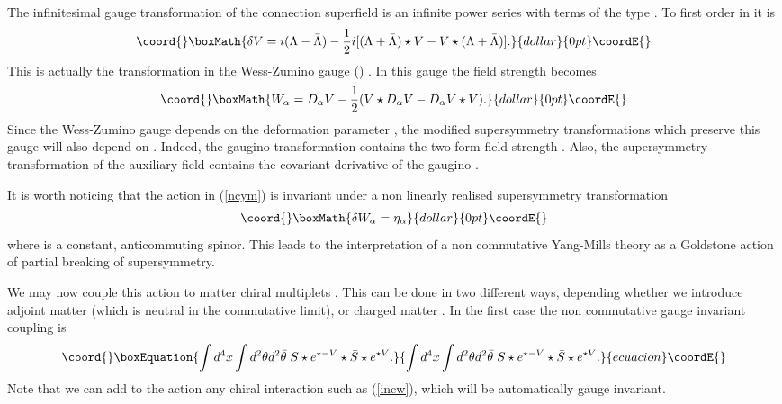 \documentclass[a4paper,12pt]{article}
\begin{document}
The infinitesimal gauge transformation of the connection superfield is an
infinite power series 
with terms  of the type \coordHE{}. To first order in \coordHE{} it is
$$\coord{}\boxMath{
\delta V=i(\Lambda-\bar \Lambda)-\frac{1}{2}i[(\Lambda+\bar \Lambda)\star
V-V\star(\Lambda +\bar\Lambda)].
}{dollar}{0pt}\coordE{}$$
This is actually the transformation in the Wess-Zumino gauge (\coordHE{}) 
\cite{wz2, fz}. In this gauge the field
strength becomes 
$$\coord{}\boxMath{
W_\alpha=D_\alpha V -\frac{1}{2}(V\star D_\alpha V-D_\alpha V\star V).
}{dollar}{0pt}\coordE{}$$
Since the Wess-Zumino gauge depends on the deformation parameter \coordHE{}, the
modified 
supersymmetry transformations which preserve this gauge will also depend
on \coordHE{}. Indeed,
the gaugino transformation contains the   two-form field strength \coordHE{}. Also, the 
supersymmetry transformation of the auxiliary field \coordHE{} contains the
covariant 
derivative of the gaugino \coordHE{}. 


It is worth noticing that the action in (\ref{ncym})  is invariant under a
non linearly realised 
supersymmetry transformation 
$$\coord{}\boxMath{
\delta W_\alpha =\eta_\alpha
}{dollar}{0pt}\coordE{}$$
where \myHighlight{$\eta_\alpha$}\coordHE{} is a constant, anticommuting spinor. This leads to the
interpretation of
 a non commutative Yang-Mills theory as a Goldstone action of partial
breaking of supersymmetry.


We may now couple this action to matter chiral multiplets \coordHE{}. This can
be done in two different ways,
depending whether we introduce adjoint matter \coordHE{} (which is
neutral in the commutative limit), or charged matter \coordHE{}.
In the first case the non commutative gauge invariant coupling is
\begin{equation}\coord{}\boxEquation{
\int d^4x\int d^2\theta d^2\bar \theta\; S\star e^{\star -V}\star\bar
S\star e^{\star V}.
\label{ci}
}{
\int d^4x\int d^2\theta d^2\bar \theta\; S\star e^{\star -V}\star\bar
S\star e^{\star V}.
}{ecuacion}\coordE{}\end{equation}
Note that we can add to the action any chiral interaction such as
(\ref{incw}), which will be 
automatically gauge invariant.
\end{document}
